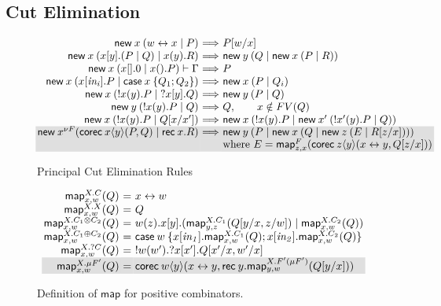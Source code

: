 \documentclass[orivec,envcountsame]{llncs}
\makeatletter
\newcommand{\cpdual}[1]{#1^\perp}
\newcommand{\cpbang}[1]{{! #1}}
\newcommand{\cpquery}[1]{{? #1}}
\newcommand{\cptyp}[2]{#1 \vdash #2}
\newcommand{\mapname}{\mathsf{map}}
\newcommand{\map}[3]{\mapname^{#1}_{#2}(#3)}
\newcommand{\mkwd}[1]{\mathsf{#1}}
\newcommand{\link}[2]{#1 \leftrightarrow #2}
\newcommand{\cut}[4]{\mkwd{new}\:#1 \: (#3 \mid #4)}
\newcommand{\replicate}[2]{{!#1(#2)}}
\newcommand{\derelict}[2]{{?#1[#2]}}
\newcommand{\rec}[1]{\mkwd{rec}\:#1}
\newcommand{\corec}[5]{\mkwd{corec}\:#1 \langle #2 \rangle (#4,#5)}
\newcommand{\clabel}[1]{\mathit{#1}}
\renewcommand{\case}[2]{\mkwd{case}\:#1\:\{#2\}}
\newcommand{\sel}[2]{#1[\clabel{#2}]}
\newcommand{\key}{\mkwd}
\newcommand{\ba}{\begin{array}}
\newcommand{\ea}{\end{array}}
\newenvironment{equations}{\[\ba{@{}r@{~}c@{~}l@{}}}{\ea\]}
\newcommand\shaderow{\noalign{\vskip-0.4pt}\rowcolor{shade}[0.6mm]}
\makeatother
\begin{document}
\subsection{Cut Elimination}

\begin{figure}[float]\small
\begin{equations}
\cut{x}{A}{\link{w}{x}}{P}
  &\Longrightarrow& P[w/x] \\
\cut{x}{A \otimes B}{x[y].(P \mid Q)}{x(y).R}
  &\Longrightarrow&
    \cut{y}{A}{Q}{\cut{x}{B}{P}{R}} \\
\cptyp{\cut{x}{1}{x[].0}{x().P}}{\Gamma}
  &\Longrightarrow&
    P \\
\cut{x}{A \oplus B}{\sel{x}{in_i}.P}{\case{x}{Q_1; Q_2}}
  &\Longrightarrow&
    \cut{x}{A}{P}{Q_i} \\
\cut{x}{\cpbang{A}}{\replicate{x}{y}.P}{\derelict{x}{y}.Q}
  &\Longrightarrow&
    \cut{y}{A}{P}{Q} \\
\cut{y}{\cpbang{A}}{\replicate{x}{y}.P}{Q}
  &\Longrightarrow&
     Q, \qquad x \notin FV(Q) \\
\cut{x}{\cpbang{A}}{\replicate{x}{y}.P}{Q[x/x']}
  &\Longrightarrow&
    \cut{x}{\cpbang{A}}{\replicate{x}{y}.P}{\cut{x'}{\cpbang{A}}{\replicate{x'}{y}.P}{Q}} \\ \shaderow
\key{new}\:x^{\nu F} %
  (\corec{x}{y}{B}{P}{Q} \mid \rec{x}.R)
  &\Longrightarrow&
    \cut{y}{B}{P}{\cut{x}{F(B)}{Q}{\cut{z}{F(\nu F)}{E}{R[z/x]}}} \\ \shaderow
&& \text{where }E = \map{F}{z,x}{\corec{z}{y}{B}{\link{x}{y}}{Q[z/x]}}
\end{equations}%
\caption{Principal Cut Elimination Rules}\label{fig:beta-reduction}
\end{figure}



\begin{figure}[float]
\small
\begin{equations}
  \map{X.C}{x,w}{Q} &=& \link{x}{w} \\
  \map{X.X}{x,w}{Q} &=& Q \\
  \map{X.C_1 \otimes C_2}{x,w}{Q} &=& w(z).x[y].(\map{X.C_1}{y,z}{Q[y/x,z/w]} \mid \map{X.C_2}{x,w}{Q}) \\
  \map{X.C_1 \oplus C_2}{x,w}{Q} &=&
    \case{w}{\sel{x}{in_1}.\map{X.C_1}{x,w}{Q}; \sel{x}{in_2}.\map{X.C_2}{x,w}{Q}} \\
  \map{X.\cpquery{C}}{x,w}{Q} &=& \replicate{w}{w'}.\derelict{x}{x'}.Q[x'/x,w'/x] \\ \shaderow
  \map{X.\mu F'}{x,w}{Q} &=& \corec{w}{y}{\nu(\cpdual{C}(A))}{\link{x}{y}}{\rec{y}.\map{X.F' (\mu F')}{y,w}{Q[y/x]}}
\end{equations}
\caption{Definition of $\mapname$ for positive combinators.}\label{fig:map}
\end{figure}
\end{document}
